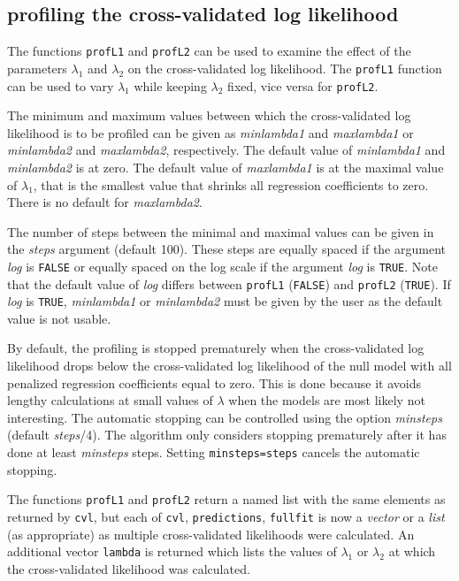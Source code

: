 \documentclass[a4paper]{article}
\newcommand{\Robject}[1]{{\texttt{#1}}}
\newcommand{\Rfunction}[1]{{\texttt{#1}}}
\newcommand{\Rclass}[1]{{\textit{#1}}}
\newcommand{\Rfunarg}[1]{{\textit{#1}}}
\begin{document}
\subsection{profiling the cross-validated log likelihood}

The functions \Rfunction{profL1} and \Rfunction{profL2} can be used to examine the effect of the parameters $\lambda_1$ and $\lambda_2$ on the cross-validated log likelihood. The \Rfunction{profL1} function can be used to vary $\lambda_1$ while keeping $\lambda_2$ fixed, vice versa for \Rfunction{profL2}.

The minimum and maximum values between which the cross-validated log likelihood is to be profiled can be given as \Rfunarg{minlambda1} and  \Rfunarg{maxlambda1} or \Rfunarg{minlambda2} and  \Rfunarg{maxlambda2}, respectively. The default value of \Rfunarg{minlambda1} and  \Rfunarg{minlambda2} is at zero.  The default value of \Rfunarg{maxlambda1} is at the maximal value of $\lambda_1$, that is the smallest value that shrinks all regression coefficients to zero. There is no default for \Rfunarg{maxlambda2}.

The number of steps between the minimal and maximal values can be given in the \Rfunarg{steps} argument (default 100). These steps are equally spaced if the argument \Rfunarg{log} is \Robject{FALSE} or equally spaced on the log scale if the argument \Rfunarg{log} is \Robject{TRUE}. Note that the default value of \Rfunarg{log} differs between \Rfunction{profL1} (\Robject{FALSE}) and \Rfunction{profL2} (\Robject{TRUE}). If \Rfunarg{log} is \Robject{TRUE}, \Rfunarg{minlambda1} or \Rfunarg{minlambda2} must be given by the user as the default value is not usable.

By default, the profiling is stopped prematurely when the cross-validated log likelihood drops below the cross-validated log likelihood of the null model with all penalized regression coefficients equal to zero. This is done because it avoids lengthy calculations at small values of $\lambda$ when the models are most likely not interesting. The automatic stopping can be controlled using the option \Rfunarg{minsteps} (default \Rfunarg{steps}/4). The algorithm only considers stopping prematurely after it has done at least \Rfunarg{minsteps} steps. Setting \Robject{minsteps=steps} cancels the automatic stopping.

The functions \Rfunction{profL1} and \Rfunction{profL2} return a named list with the same elements as returned by \Rfunction{cvl}, but each of \Robject{cvl}, \Robject{predictions}, \Robject{fullfit} is now a \Rclass{vector} or a \Rclass{list} (as appropriate) as multiple cross-validated likelihoods were calculated. An additional vector \Robject{lambda} is returned which lists the values of $\lambda_1$ or $\lambda_2$ at which the cross-validated likelihood was calculated.
\end{document}
